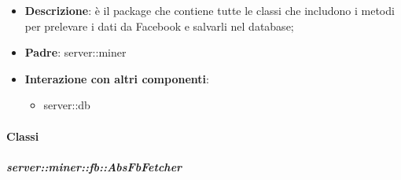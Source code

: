 \begin{itemize}
  \item \textbf{Descrizione}: è il package che contiene tutte le classi che includono i metodi per prelevare i dati da Facebook e salvarli nel database;
  \item \textbf{Padre}: server::miner
  \item \textbf{Interazione con altri componenti}:
  	\begin{itemize}
  		\item server::db
  	\end{itemize}
\end{itemize}

	\paragraph{Classi} %
		\subparagraph{server::miner::fb::AbsFbFetcher} %
		\label{subp:server_miner_fb_AbsFbFetcher}
